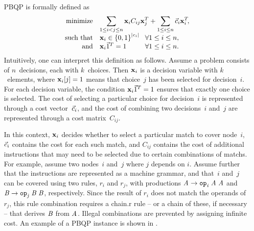 \Gls{PBQP} is formally defined as
%
\begin{equation}
  \begin{array}{rll}
    \text{minimize}
      & \multicolumn{2}{c}{%
          \displaystyle\sum_{1 \leq i < j \leq n} \mVar{x}_i C_{ij} \mVar{x}_j^T +
          \displaystyle\sum_{1 \leq i \leq n} \mVector{c}_i \mVar{x}_i^T\!,%
        } \\
    \text{such that}
      & \mVar{x}_i \in \mSet{0, 1}^{|c_i|}\!
      & \forall 1 \leq i \leq n, \\
    \text{and}
      & \mVar{x}_i \mVector{1}^T = 1
      & \forall 1 \leq i \leq n. \\
  \end{array}
\end{equation}
%
Intuitively, one can interpret this definition as follows.
%
Assume a problem consists of $n$~decisions, each with $k$~choices.
%
Then $\mVar{x}_i$ is a decision variable with $k$~elements, where
\mbox{$\mVar{x}_i[j] = 1$} means that choice~$j$ has been selected for
decision~$i$.
%
For each decision variable, the condition \mbox{$\mVar{x}_i
  \raisebox{0pt}[\height-2pt]{$\mVector{1}^T$} = 1$} ensures that exactly one
choice is selected.
%
The cost of selecting a particular choice for decision~$i$ is represented
through a cost vector~$\vec{c}_i$, and the cost of combining two
decisions~$i$ and~$j$ are represented through a cost matrix~$C_{ij}$.

In this context, $\mVar{x}_i$ decides whether to select a particular \gls{match}
to cover \gls{node}~$i$, $\vec{c}_i$ contains the cost for each such
\gls{match}, and $C_{ij}$ contains the cost of additional \glspl{instruction}
that may need to be selected due to certain combinations of \glspl{match}.
%
For example, assume two nodes~$i$ and~$j$ where $j$ depends on $i$.
%
Assume further that the \glspl{instruction} are represented as a \gls{machine
  grammar}, and that~$i$ and~$j$ can be covered using two \glspl{rule}, $r_i$
and $r_j$, with \glspl{production} \mbox{$\mNT{A} \rightarrow
  \irCode{op}_{\mathit{i}} \; \mNT{A} \; \mNT{A}$} and \mbox{$\mNT{B}
  \rightarrow \irCode{op}_{\mathit{j}} \; \mNT{B} \; \mNT{B}$}, respectively.
%
Since the result of $r_i$ does not match the operands of $r_j$, this \gls{rule}
combination requires a \gls{chain.r} \gls{rule} -- or a chain of these, if
necessary -- that derives $\mNT{B}$ from $\mNT{A}$.
%
Illegal combinations are prevented by assigning infinite cost.
%
An example of a \gls{PBQP} instance is shown in .

